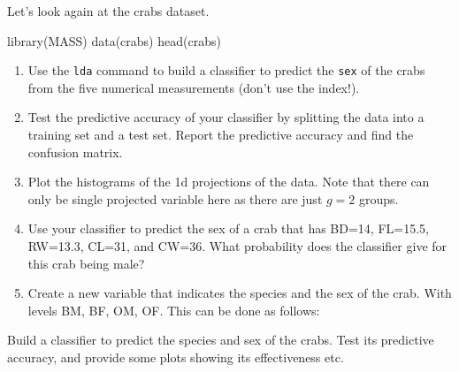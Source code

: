 \documentclass[
]{book}
\newenvironment{Shaded}{\begin{snugshade}}{\end{snugshade}}
\newcommand{\AttributeTok}[1]{\textcolor[rgb]{0.77,0.63,0.00}{#1}}
\newcommand{\FunctionTok}[1]{\textcolor[rgb]{0.00,0.00,0.00}{#1}}
\newcommand{\NormalTok}[1]{#1}
\newcommand{\OtherTok}[1]{\textcolor[rgb]{0.56,0.35,0.01}{#1}}
\newcommand{\SpecialCharTok}[1]{\textcolor[rgb]{0.00,0.00,0.00}{#1}}
\newcommand{\StringTok}[1]{\textcolor[rgb]{0.31,0.60,0.02}{#1}}
\theoremstyle{definition}
\theoremstyle{definition}
\theoremstyle{definition}
\theoremstyle{definition}
\theoremstyle{remark}
\begin{document}
Let's look again at the crabs dataset.

\begin{Shaded}
\begin{Highlighting}[]
\FunctionTok{library}\NormalTok{(MASS)}
\FunctionTok{data}\NormalTok{(crabs)}
\FunctionTok{head}\NormalTok{(crabs)}
\end{Highlighting}
\end{Shaded}

\begin{enumerate}
\def\labelenumi{\roman{enumi}.}
\item
  Use the \texttt{lda} command to build a classifier to predict the \texttt{sex} of the crabs from the
  five numerical measurements (don't use the index!).
\item
  Test the predictive accuracy of your classifier by splitting the data into a training set and a test set. Report the predictive accuracy and find the confusion matrix.
\item
  Plot the histograms of the 1d projections of the data. Note that there can only be single projected variable here as there are just \(g=2\) groups.
\item
  Use your classifier to predict the sex of a crab that has BD=14, FL=15.5, RW=13.3, CL=31, and CW=36. What probability does the classifier give for this crab being male?
\item
  Create a new variable that indicates the species and the sex of the crab. With levels
  BM, BF, OM, OF. This can be done as follows:
\end{enumerate}

\begin{Shaded}
\end{Shaded}

Build a classifier to predict the species and sex of the crabs. Test its predictive accuracy, and provide some plots showing its effectiveness etc.
\end{document}

